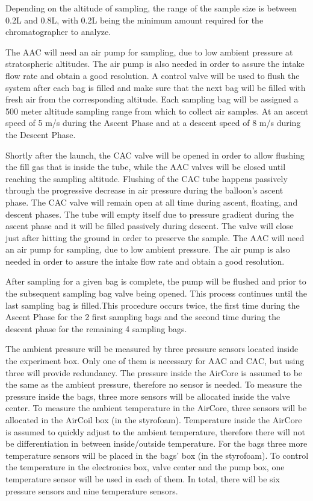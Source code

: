 Depending on the altitude of sampling, the range of the sample size is between 0.2L and 0.8L, with 0.2L being the minimum amount required for the chromatographer to analyze. 

The AAC will need an air pump for sampling, due to low ambient pressure at stratospheric altitudes. The air pump is also needed in order to assure the intake flow rate and obtain a good resolution. A control valve will be used to flush the system after each bag is filled and make sure that the next bag will be filled with fresh air from the corresponding altitude. Each sampling bag will be assigned a 500 meter altitude sampling range from which to collect air samples. At an ascent speed of 5 m/s during the Ascent Phase and at a descent speed of 8 m/s during the Descent Phase. 

Shortly after the launch, the CAC valve will be opened in order to allow flushing the fill gas that is inside the tube, while the AAC valves will be closed until reaching the sampling altitude. Flushing of the CAC tube happens passively through the progressive decrease in air pressure during the balloon's ascent phase. The CAC valve will remain open at all time during ascent, floating, and descent phases. The tube will empty itself due to pressure gradient during the ascent phase and it will be filled passively during descent. The valve will close just after hitting the ground in order to preserve the sample. The AAC will need an air pump for sampling, due to low ambient pressure. The air pump is also needed in order to assure the intake flow rate and obtain a good resolution.

After sampling for a given bag is complete, the pump will be flushed and prior to the subsequent sampling bag valve being opened. This process continues until the last sampling bag is filled.This procedure occurs twice, the first time during the Ascent Phase for the 2 first sampling bags and the second time during the descent phase for the remaining 4 sampling bags.

The ambient pressure will be measured by three pressure sensors located inside the experiment box. Only one of them is necessary for AAC and CAC, but using three will provide redundancy. The pressure inside the AirCore is assumed to be the same as the ambient pressure, therefore no sensor is needed. To measure the pressure inside the bags, three more sensors will be allocated inside the valve center. To measure the ambient temperature in the AirCore, three sensors will be allocated in the AirCoil box (in the styrofoam). Temperature inside the AirCore is assumed to quickly adjust to the ambient temperature, therefore there will not be differentiation in between inside/outside temperature. For the bags three more temperature sensors will be placed in the bags' box (in the styrofoam). To control the temperature in the electronics box, valve center and the pump box, one temperature sensor will be used in each of them. In total, there will be six pressure sensors and nine temperature sensors. 


